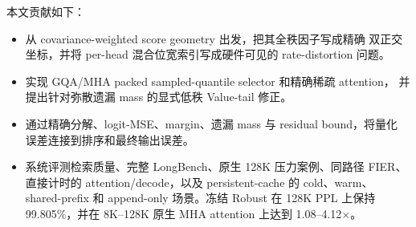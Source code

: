本文贡献如下：
\begin{itemize}
  \item 从 covariance-weighted score geometry 出发，把其全秩因子写成精确
  双正交坐标，并将 per-head 混合位宽索引写成硬件可见的 rate-distortion 问题。
  \item 实现 GQA/MHA packed sampled-quantile selector 和精确稀疏 attention，
  并提出针对弥散遗漏 mass 的显式低秩 Value-tail 修正。
  \item 通过精确分解、logit-MSE、margin、遗漏 mass 与 residual bound，将量化
  误差连接到排序和最终输出误差。
  \item 系统评测检索质量、完整 LongBench、原生 128K 压力案例、同路径 FIER、
  直接计时的 attention/decode，以及 persistent-cache 的 cold、warm、
  shared-prefix 和 append-only 场景。冻结 Robust 在 128K PPL 上保持
  99.805\%，并在 8K--128K 原生 MHA attention 上达到
  1.08--4.12$\times$。
\end{itemize}
